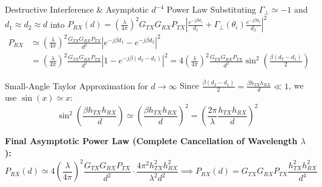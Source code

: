 \documentclass[aspectratio=169, 10pt]{beamer}
\begin{document}
\begin{frame}{Destructive Interference \& Asymptotic $d^{-4}$ Power Law}
\small
    Substituting $\Gamma_\perp \simeq -1$ and $d_1 \approx d_2 \approx d$ into {\footnotesize$P_{RX}(d) = \left(\frac{\lambda}{4\pi}\right)^2 G_{TX} G_{RX} P_{TX} \left| \frac{e^{-j\beta d_1}}{d_1} + \Gamma_\perp(\theta_i) \frac{e^{-j\beta d_2}}{d_2} \right|^2$}
    \begin{align}
        P_{RX} &\simeq \left(\frac{\lambda}{4\pi}\right)^2 \frac{G_{TX} G_{RX} P_{TX}}{d^2} \left| e^{-j\beta d_1} - e^{-j\beta d_2} \right|^2 \nonumber \\
        &= \left(\frac{\lambda}{4\pi}\right)^2 \frac{G_{TX} G_{RX} P_{TX}}{d^2} \left| 1 - e^{-j\beta(d_2 - d_1)} \right|^2 
        = 4 \left(\frac{\lambda}{4\pi}\right)^2 \frac{G_{TX} G_{RX} P_{TX}}{d^2} \sin^2\left(\frac{\beta(d_2 - d_1)}{2}\right)
    \end{align}

    \begin{block}{Small-Angle Taylor Approximation for $d \to \infty$}
        Since $\frac{\beta(d_2 - d_1)}{2} = \frac{\beta h_{TX} h_{RX}}{d} \ll 1$, we use $\sin(x) \simeq x$:
        \begin{equation}
            \sin^2\left(\frac{\beta h_{TX} h_{RX}}{d}\right) \simeq \left(\frac{\beta h_{TX} h_{RX}}{d}\right)^2 = \left(\frac{2\pi}{\lambda} \frac{h_{TX} h_{RX}}{d}\right)^2
        \end{equation}
    \end{block}

    \textbf{Final Asymptotic Power Law (Complete Cancellation of Wavelength $\lambda$):}
    \begin{equation}
        P_{RX}(d) \simeq 4 \left(\frac{\lambda}{4\pi}\right)^2 \frac{G_{TX} G_{RX} P_{TX}}{d^2} \cdot \frac{4\pi^2 h_{TX}^2 h_{RX}^2}{\lambda^2 d^2} 
        \implies \boxed{P_{RX}(d) = G_{TX} G_{RX} P_{TX} \frac{h_{TX}^2 h_{RX}^2}{d^4}}
    \end{equation}
\end{frame}
\end{document}
